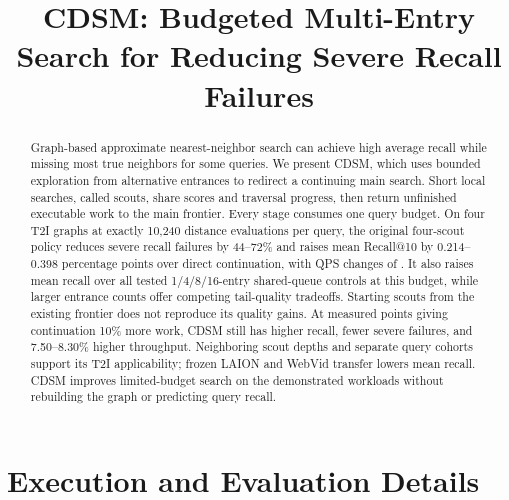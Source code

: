 \documentclass[sigconf,nonacm]{acmart}
\begin{document}
\title{CDSM: Budgeted Multi-Entry Search for Reducing Severe Recall Failures}
\begin{abstract}
Graph-based approximate nearest-neighbor search can achieve high average recall while missing most true neighbors for some queries. We present CDSM, which uses bounded exploration from alternative entrances to redirect a continuing main search. Short local searches, called scouts, share scores and traversal progress, then return unfinished executable work to the main frontier. Every stage consumes one query budget. On four T2I graphs at exactly 10,240 distance evaluations per query, the original four-scout policy reduces severe recall failures by 44--72\% and raises mean Recall@10 by 0.214--0.398 percentage points over direct continuation, with QPS changes of \rTwoQpsC{}. It also raises mean recall over all tested 1/4/8/16-entry shared-queue controls at this budget, while larger entrance counts offer competing tail-quality tradeoffs. Starting scouts from the existing frontier does not reproduce its quality gains. At measured points giving continuation 10\% more work, CDSM still has higher recall, fewer severe failures, and 7.50--8.30\% higher throughput. Neighboring scout depths and separate query cohorts support its T2I applicability; frozen LAION and WebVid transfer lowers mean recall. CDSM improves limited-budget search on the demonstrated workloads without rebuilding the graph or predicting query recall.
\end{abstract}
\maketitle
\pagestyle{plain}








\appendix
\section{Execution and Evaluation Details}\label{app:details}





\balance


\end{document}
